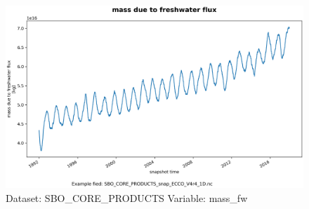 \begin{figure}[H]
\centering
\includegraphics[scale=0.55]{../images/plots/oneD_plots/SBO_Core_Products/mass_fw.png}
\caption{Dataset: SBO\_CORE\_PRODUCTS Variable: mass\_fw}
\label{tab:table-SBO_CORE_PRODUCTS_mass_fw-Plot}
\end{figure}
\pagebreak
